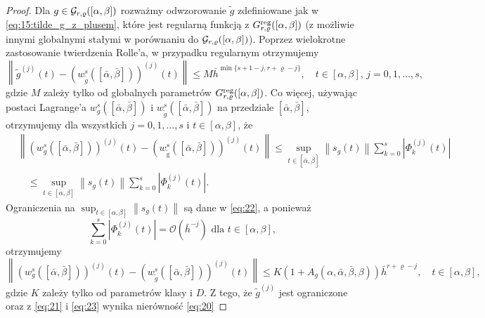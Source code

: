 \documentclass[oik, pdftex, man]{mgrwms}
\begin{document}
\begin{proof}
        Dla $g \in \mathcal{G}_{r,\varrho}([\alpha,\beta])$ rozważmy odwzorowanie $\tilde{g}$ zdefiniowane jak w \eqref{eq:15:tilde_g_z_plusem}, które jest regularną funkcją z $G_{r, \varrho}^{\mathrm{reg}}([\alpha, \beta])$ (z możliwie innymi globalnymi stałymi w porównaniu do $\mathcal{G}_{r,\varrho}([\alpha,\beta])$). Poprzez wielokrotne zastosowanie twierdzenia Rolle'a, w przypadku regularnym otrzymujemy
        \begin{equation} \label{eq:21}
            \left\|\tilde{g}^{(j)}(t)-\left(w_{\tilde{g}}^{s}([\bar{\alpha}, \bar{\beta}])\right)^{(j)}(t)\right\| \leq M \bar{h}^{\min \{s+1-j, r+\varrho-j\}}, \quad t \in[\alpha, \beta],\, j=0,1, \ldots, s,
        \end{equation}
        gdzie $M$ zależy tylko od globalnych parametrów $G_{r, \varrho}^{\mathrm{reg}}([\alpha, \beta])$. Co więcej, używając postaci Lagrange'a $w_{g}^{s}([\bar{\alpha}, \bar{\beta}])$ i $w_{\tilde{g}}^{s}([\bar{\alpha}, \bar{\beta}])$ na przedziale $[\bar{\alpha}, \bar{\beta}]$, otrzymujemy dla wszystkich $j=0,1, \ldots, s$ i $t \in[\alpha, \beta]$, że
        \begin{equation*}
            \begin{aligned}
                &\left\|\left(w_{g}^{s}([\bar{\alpha}, \bar{\beta}])\right)^{(j)}(t)-\left(w_{\tilde{\mathrm{g}}}^{s}([\bar{\alpha}, \bar{\beta}])\right)^{(j)}(t)\right\| \leq \sup _{t \in[\bar{\alpha}, \bar{\beta}]}\left\|s_{g}(t)\right\| \sum_{k=0}^{s}\left|\Phi_{k}^{(j)}(t)\right| \\
                &\quad \leq \sup _{t \in[\alpha, \beta]}\left\|s_{g}(t)\right\| \sum_{k=0}^{s}\left|\Phi_{k}^{(j)}(t)\right|.
                \end{aligned}
        \end{equation*}
        Ograniczenia na $\displaystyle \sup _{t \in[\alpha, \beta]}\left\|s_{g}(t)\right\|$ są dane w \eqref{eq:22}, a ponieważ
        \begin{equation*}
            \sum_{k=0}^{s}\left|\Phi_{k}^{(j)}(t)\right|=\mathcal{O}\left(\bar{h}^{-j}\right) \text{ dla } t \in[\alpha, \beta],
        \end{equation*}
        otrzymujemy
        \begin{equation} \label{eq:23}
            \left\|\left(w_{g}^{s}([\bar{\alpha}, \bar{\beta}])\right)^{(j)}(t)-\left(w_{\tilde{g}}^{s}([\bar{\alpha}, \bar{\beta}])\right)^{(j)}(t)\right\| \leq K\left(1+A_{g}(\alpha, \bar{\alpha}, \bar{\beta}, \beta)\right) \bar{h}^{r+\varrho-j}, \quad t \in[\alpha, \beta],
        \end{equation}
        gdzie $K$ zależy tylko od parametrów klasy i $D$. Z tego, że $\tilde{g}^{(j)}$ jest ograniczone oraz z \eqref{eq:21} i \eqref{eq:23} wynika nierówność \eqref{eq:20}
    \end{proof}
\end{document}
